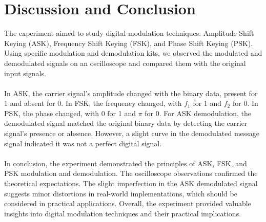 \documentclass[12pt]{article}
\begin{document}
\section*{Discussion and Conclusion}
The experiment aimed to study digital modulation techniques: Amplitude Shift Keying (ASK), Frequency Shift Keying (FSK), and Phase Shift Keying (PSK). Using specific modulation and demodulation kits, we observed the modulated and demodulated signals on an oscilloscope and compared them with the original input signals.
\\\\
In ASK, the carrier signal's amplitude changed with the binary data, present for 1 and absent for 0. In FSK, the frequency changed, with \( f_1 \) for 1 and \( f_2 \) for 0. In PSK, the phase changed, with 0 for 1 and \( \pi \) for 0. For ASK demodulation, the demodulated signal matched the original binary data by detecting the carrier signal's presence or absence. However, a slight curve in the demodulated message signal indicated it was not a perfect digital signal.
\\\\
In conclusion, the experiment demonstrated the principles of ASK, FSK, and PSK modulation and demodulation. The oscilloscope observations confirmed the theoretical expectations. The slight imperfection in the ASK demodulated signal suggests minor distortions in real-world implementations, which should be considered in practical applications. Overall, the experiment provided valuable insights into digital modulation techniques and their practical implications.


\renewcommand{\bibname}{References}

\end{document}

